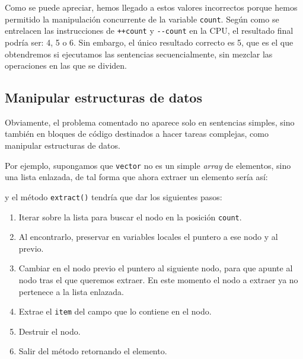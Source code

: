 Como se puede apreciar, hemos llegado a estos valores incorrectos porque
hemos permitido la manipulación concurrente de la variable
\texttt{count}. Según como se entrelacen las instrucciones de
\texttt{++count} y \texttt{-\/-count} en la CPU, el resultado final
podría ser: 4, 5 o 6. Sin embargo, el único resultado correcto es 5, que
es el que obtendremos si ejecutamos las sentencias secuencialmente, sin
mezclar las operaciones en las que se dividen.

\subsection{Manipular estructuras de
datos}\label{_manipular_estructuras_de_datos}

Obviamente, el problema comentado no aparece solo en sentencias simples,
sino también en bloques de código destinados a hacer tareas complejas,
como manipular estructuras de datos.

Por ejemplo, supongamos que \texttt{vector} no es un simple \emph{array}
de elementos, sino una lista enlazada, de tal forma que ahora extraer un
elemento sería así:

\begin{Shaded}
\begin{Highlighting}[]
\OperatorTok{{-}{-}}\OperatorTok{;}
\OperatorTok{=}\OperatorTok{(}\OperatorTok{);}
\end{Highlighting}
\end{Shaded}

y el método \texttt{extract()} tendría que dar los siguientes pasos:

\begin{enumerate}
\def\labelenumi{\arabic{enumi}.}
\item
  Iterar sobre la lista para buscar el nodo en la posición
  \texttt{count}.
\item
  Al encontrarlo, preservar en variables locales el puntero a ese nodo y
  al previo.
\item
  Cambiar en el nodo previo el puntero al siguiente nodo, para que
  apunte al nodo tras el que queremos extraer. En este momento el nodo a
  extraer ya no pertenece a la lista enlazada.
\item
  Extrae el \texttt{item} del campo que lo contiene en el nodo.
\item
  Destruir el nodo.
\item
  Salir del método retornando el elemento.
\end{enumerate}

